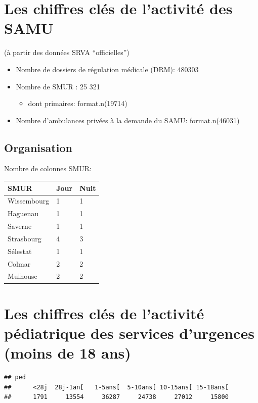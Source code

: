 \documentclass[]{article}
\begin{document}
\section{Les chiffres clés de l'activité des
SAMU}\label{les-chiffres-cles-de-lactivite-des-samu}

(à partir des données SRVA ``officielles'')

\begin{itemize}
\itemsep1pt\parskip0pt
\item
  Nombre de dossiers de régulation médicale (DRM): 480303
\item
  Nombre de SMUR : 25 321

  \begin{itemize}
  \itemsep1pt\parskip0pt
  \item
    dont primaires: format.n(19714)
  \end{itemize}
\item
  Nombre d'ambulances privées à la demande du SAMU: format.n(46031)
\end{itemize}

\subsection{Organisation}\label{organisation}

Nombre de colonnes SMUR:

\begin{longtable}[c]{@{}lll@{}}
\toprule
SMUR & Jour & Nuit\tabularnewline
\midrule
\endhead
Wissembourg & 1 & 1\tabularnewline
Haguenau & 1 & 1\tabularnewline
Saverne & 1 & 1\tabularnewline
Strasbourg & 4 & 3\tabularnewline
Sélestat & 1 & 1\tabularnewline
Colmar & 2 & 2\tabularnewline
Mulhouse & 2 & 2\tabularnewline
\bottomrule
\end{longtable}

\section{Les chiffres clés de l'activité pédiatrique des services
d'urgences (moins de 18
ans)}\label{les-chiffres-cles-de-lactivite-pediatrique-des-services-durgences-moins-de-18-ans}

\begin{verbatim}
## ped
##      <28j  28j-1an[   1-5ans[  5-10ans[ 10-15ans[ 15-18ans[ 
##      1791     13554     36287     24738     27012     15800
\end{verbatim}
\end{document}
